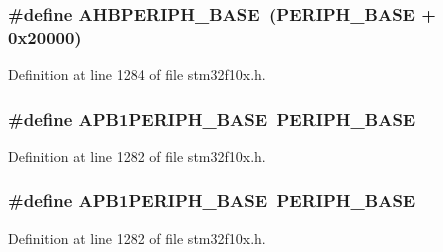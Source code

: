 \subsubsection[{\texorpdfstring{A\+H\+B\+P\+E\+R\+I\+P\+H\+\_\+\+B\+A\+SE}{AHBPERIPH_BASE}}]{\setlength{\rightskip}{0pt plus 5cm}\#define A\+H\+B\+P\+E\+R\+I\+P\+H\+\_\+\+B\+A\+SE~({\bf P\+E\+R\+I\+P\+H\+\_\+\+B\+A\+SE} + 0x20000)}\hypertarget{group___peripheral__memory__map_ga92eb5d49730765d2abd0f5b09548f9f5}{}\label{group___peripheral__memory__map_ga92eb5d49730765d2abd0f5b09548f9f5}


Definition at line 1284 of file stm32f10x.\+h.

\subsubsection[{\texorpdfstring{A\+P\+B1\+P\+E\+R\+I\+P\+H\+\_\+\+B\+A\+SE}{APB1PERIPH_BASE}}]{\setlength{\rightskip}{0pt plus 5cm}\#define A\+P\+B1\+P\+E\+R\+I\+P\+H\+\_\+\+B\+A\+SE~{\bf P\+E\+R\+I\+P\+H\+\_\+\+B\+A\+SE}}\hypertarget{group___peripheral__memory__map_ga45666d911f39addd4c8c0a0ac3388cfb}{}\label{group___peripheral__memory__map_ga45666d911f39addd4c8c0a0ac3388cfb}


Definition at line 1282 of file stm32f10x.\+h.

\subsubsection[{\texorpdfstring{A\+P\+B1\+P\+E\+R\+I\+P\+H\+\_\+\+B\+A\+SE}{APB1PERIPH_BASE}}]{\setlength{\rightskip}{0pt plus 5cm}\#define A\+P\+B1\+P\+E\+R\+I\+P\+H\+\_\+\+B\+A\+SE~{\bf P\+E\+R\+I\+P\+H\+\_\+\+B\+A\+SE}}\hypertarget{group___peripheral__memory__map_ga45666d911f39addd4c8c0a0ac3388cfb}{}\label{group___peripheral__memory__map_ga45666d911f39addd4c8c0a0ac3388cfb}


Definition at line 1282 of file stm32f10x.\+h.

